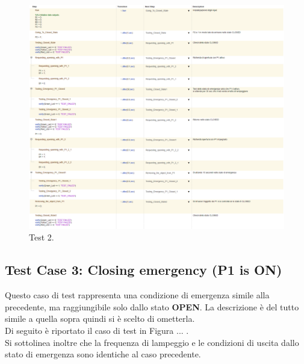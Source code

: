 \documentclass[12pt]{article}
\begin{document}
\begin{figure}[H]
    
    \hspace{-2.3cm} %
    \includegraphics[width=1.3\textwidth]{Immagini_Test/Test_2_img.PNG}
    \caption{Test 2.}
    \label{fig:Test_2}
\end{figure}

\subsection{Test Case 3: Closing emergency (P1 is ON)}

Questo caso di test rappresenta una condizione di emergenza simile alla precedente, ma raggiungibile solo dallo stato \textbf{OPEN}. La descrizione è del tutto simile a quella sopra quindi si è scelto di ometterla. \\
Di seguito è riportato il caso di test in Figura ... .\\
Si sottolinea inoltre che la frequenza di lampeggio e le condizioni di uscita dallo stato di emergenza sono identiche al caso precedente.
\end{document}
